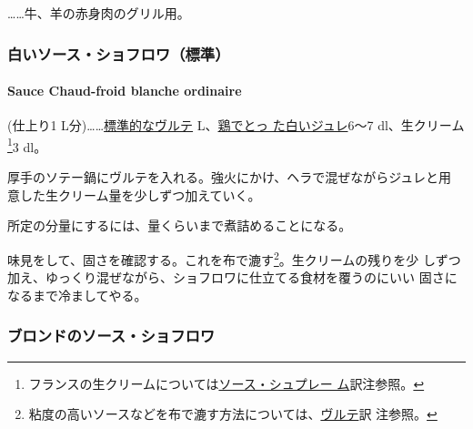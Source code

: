 \begin{recette}
\ldots{}\ldots{}牛、羊の赤身肉のグリル用。

\maeaki

\hypertarget{ux767dux3044ux30bdux30fcux30b9ux30b7ux30e7ux30d5ux30edux30efux6a19ux6e96}{%
\subsubsection{白いソース・ショフロワ（標準）}\label{ux767dux3044ux30bdux30fcux30b9ux30b7ux30e7ux30d5ux30edux30efux6a19ux6e96}}

\hypertarget{sauce-chaud-froid-blanche-ordinaire}{%
\paragraph{Sauce Chaud-froid blanche
ordinaire}\label{sauce-chaud-froid-blanche-ordinaire}}


(仕上り1
L分)\ldots{}\ldots{}\protect\hyperlink{veloute}{標準的なヴルテ}\troisquarts{}
L、\protect\hyperlink{gelee-de-volaille}{鶏でとっ た白いジュレ}6〜7
dl、生クリーム\footnote{フランスの生クリームについては\protect\hyperlink{sauce-supreme}{ソース・シュプレー
  ム}訳注参照。}3 dl。

厚手のソテー鍋にヴルテを入れる。強火にかけ、ヘラで混ぜながらジュレと用
意した生クリーム\untiers{}量を少しずつ加えていく。

所定の分量にするには、\deuxtiers{}量くらいまで煮詰めることになる。

味見をして、固さを確認する。これを布で漉す\footnote{粘度の高いソースなどを布で漉す方法については、\protect\hyperlink{veloute}{ヴルテ}訳
  注参照。}。生クリームの残りを少
しずつ加え、ゆっくり混ぜながら、ショフロワに仕立てる食材を覆うのにいい
固さになるまで冷ましてやる。

\maeaki

\hypertarget{ux30d6ux30edux30f3ux30c9ux306eux30bdux30fcux30b9ux30b7ux30e7ux30d5ux30edux30ef}{%
\subsubsection{ブロンドのソース・ショフロワ}\label{ux30d6ux30edux30f3ux30c9ux306eux30bdux30fcux30b9ux30b7ux30e7ux30d5ux30edux30ef}}


\end{recette}
